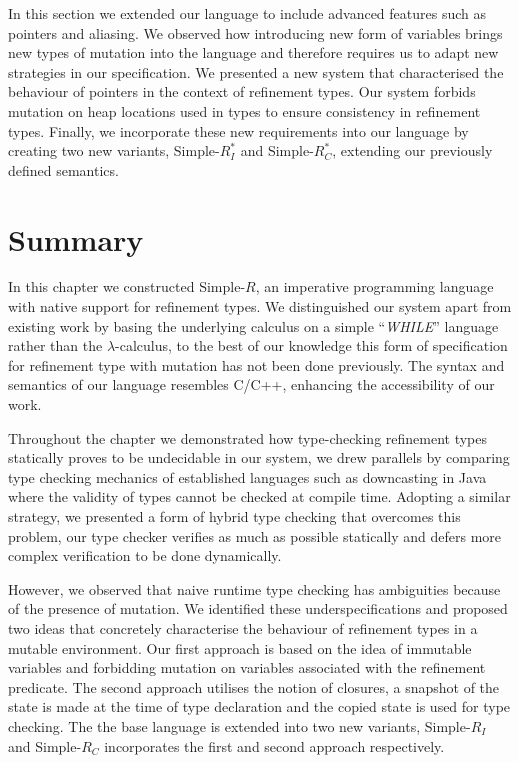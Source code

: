 \documentclass[a4paper,12pt]{report}
\begin{document}
\par
In this section we extended our language to include advanced features such 
as pointers and aliasing. We observed how introducing new form of 
variables brings new types of mutation into the language and therefore 
requires us to adapt new strategies in our specification. We presented  
a new system that characterised the behaviour of pointers in the context of 
refinement types. Our system forbids mutation on heap locations used in types 
to ensure consistency in refinement types. Finally, we incorporate these new requirements 
into our language by creating two new variants, Simple-$R^{*}_{I}$ 
and Simple-$R^{*}_{C}$, extending our previously defined semantics. 

\section{Summary}
In this chapter we constructed Simple-$R$, an imperative programming language with native 
support for refinement types. We distinguished our 
system apart from existing work by basing the underlying calculus 
on a simple ``\textit{WHILE}'' language 
rather than the $\lambda$-calculus, to the best of our knowledge this form of 
specification for refinement type with mutation has not been done 
previously. The syntax and semantics of our 
language resembles C/C++, enhancing the accessibility of our work.

\par
Throughout the chapter we demonstrated how type-checking refinement types 
statically proves to be undecidable in our system, we drew parallels by comparing 
type checking mechanics of established languages such as downcasting in Java 
where the validity of types cannot be checked at compile time. 
Adopting a similar strategy, we presented a form of hybrid type checking 
that overcomes this problem, our type checker verifies as much as possible 
statically and defers more complex verification to be done dynamically. 

\par
However, we observed that naive runtime type checking has ambiguities 
because of the presence of mutation. We identified these underspecifications and 
proposed two ideas that concretely characterise the behaviour of refinement 
types in a mutable environment. Our first approach is based on the 
idea of immutable variables and forbidding mutation on variables associated 
with the refinement predicate. The second approach utilises the notion of closures, 
a snapshot of the state is made at the time of type declaration and the copied 
state is used for type checking. The the base language is extended into two 
new variants, Simple-$R_{I}$ and Simple-$R_{C}$ incorporates the first 
and second approach respectively.
\end{document}
